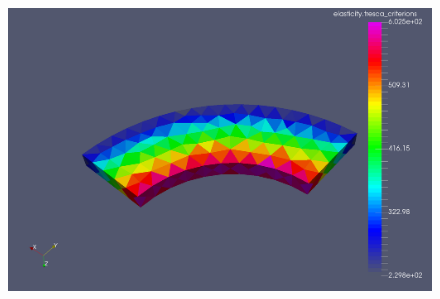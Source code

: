 \documentclass[11pt]{amsart}
\begin{document}
\begin{figure}
\centering\includegraphics[width=4.75truein]{./images/learning/elasticity/Coarse_Tresca.png}


\end{figure}
\end{document}
